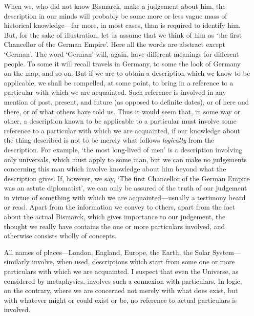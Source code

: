 \documentclass[oneside,letterpaper,12pt]{book}
\begin{document}
When we, who did not know Bismarck, make a judgement about him, the
description in our minds will probably be some more or less vague mass
of historical knowledge---far more, in most cases, than is required to
identify him. But, for the sake of illustration, let us assume that we
think of him as `the first Chancellor of the German
Empire'. Here all the words are abstract except
`German'. The word
`German' will, again, have different
meanings for different people. To some it will recall travels in
Germany, to some the look of Germany on the map, and so on. But if we
are to obtain a description which we know to be applicable, we shall be
compelled, at some point, to bring in a reference to a particular with
which we are acquainted. Such reference is involved in any mention of
past, present, and future (as opposed to definite dates), or of here and
there, or of what others have told us. Thus it would seem that, in some
way or other, a description known to be applicable to a particular must
involve some reference to a particular with which we are acquainted, if
our knowledge about the thing described is not to be merely what follows
\emph{logically} from the description. For example, `the
most long-lived of men' is a description involving only
universals, which must apply to some man, but we can make no judgements
concerning this man which involve knowledge about him beyond what the
description gives. If, however, we say, `The first
Chancellor of the German Empire was an astute
diplomatist', we can only be assured of the truth of our
judgement in virtue of something with which we are acquainted---usually
a testimony heard or read. Apart from the information we convey to
others, apart from the fact about the actual Bismarck, which gives
importance to our judgement, the thought we really have contains the one
or more particulars involved, and otherwise consists wholly of concepts.

All names of places---London, England, Europe, the Earth, the Solar
System---similarly involve, when used, descriptions which start from
some one or more particulars with which we are acquainted. I suspect
that even the Universe, as considered by metaphysics, involves such a
connexion with particulars. In logic, on the contrary, where we are
concerned not merely with what does exist, but with whatever might or
could exist or be, no reference to actual particulars is involved.
\end{document}
